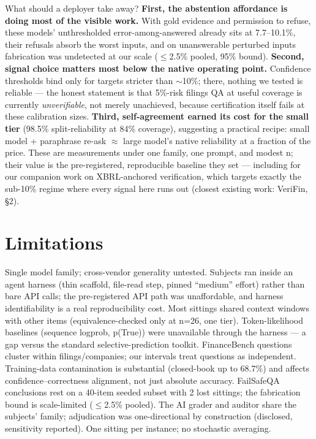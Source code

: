 \documentclass[11pt]{article}
\begin{document}
What should a deployer take away? \textbf{First, the abstention affordance is doing most of the visible work.} With gold evidence and permission to refuse, these models' unthresholded error-among-answered already sits at 7.7--10.1\%, their refusals absorb the worst inputs, and on unanswerable perturbed inputs fabrication was undetected at our scale ($\leq$2.5\% pooled, 95\% bound). \textbf{Second, signal choice matters most below the native operating point.} Confidence thresholds bind only for targets stricter than $\sim$10\%; there, nothing we tested is reliable --- the honest statement is that 5\%-risk filings QA at useful coverage is currently \emph{unverifiable}, not merely unachieved, because certification itself fails at these calibration sizes. \textbf{Third, self-agreement earned its cost for the small tier} (98.5\% split-reliability at 84\% coverage), suggesting a practical recipe: small model + paraphrase re-ask $\approx$ large model's native reliability at a fraction of the price. These are measurements under one family, one prompt, and modest n; their value is the pre-registered, reproducible baseline they set --- including for our companion work on XBRL-anchored verification, which targets exactly the sub-10\% regime where every signal here runs out (closest existing work: VeriFin, \S{}2).


\section{Limitations}

Single model family; cross-vendor generality untested. Subjects ran inside an agent harness (thin scaffold, file-read step, pinned ``medium'' effort) rather than bare API calls; the pre-registered API path was unaffordable, and harness identifiability is a real reproducibility cost. Most sittings shared context windows with other items (equivalence-checked only at n=26, one tier). Token-likelihood baselines (sequence logprob, p(True)) were unavailable through the harness --- a gap versus the standard selective-prediction toolkit. FinanceBench questions cluster within filings/companies; our intervals treat questions as independent. Training-data contamination is substantial (closed-book up to 68.7\%) and affects confidence--correctness alignment, not just absolute accuracy. FailSafeQA conclusions rest on a 40-item seeded subset with 2 lost sittings; the fabrication bound is scale-limited ($\leq$2.5\% pooled). The AI grader and auditor share the subjects' family; adjudication was one-directional by construction (disclosed, sensitivity reported). One sitting per instance; no stochastic averaging.
\end{document}
